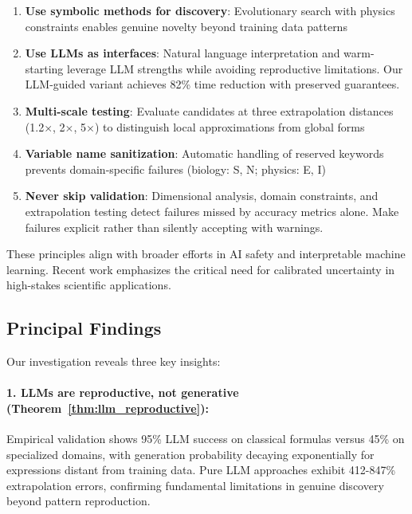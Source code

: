 \documentclass[twoside,11pt]{article}
\begin{document}
\begin{enumerate}
\item \textbf{Use symbolic methods for discovery}: Evolutionary search with physics constraints enables genuine novelty beyond training data patterns\citep{koza1994genetic}

\item \textbf{Use LLMs as interfaces}: Natural language interpretation and warm-starting leverage LLM strengths while avoiding reproductive limitations. Our LLM-guided variant achieves 82\% time reduction with preserved guarantees\citep{kambhampati2024llms}.

\item \textbf{Multi-scale testing}: Evaluate candidates at three extrapolation distances (1.2$\times$, 2$\times$, 5$\times$) to distinguish local approximations from global forms

\item \textbf{Variable name sanitization}: Automatic handling of reserved keywords prevents domain-specific failures (biology: S, N; physics: E, I)

\item \textbf{Never skip validation}: Dimensional analysis, domain constraints, and extrapolation testing detect failures missed by accuracy metrics alone. Make failures explicit rather than silently accepting with warnings.
\end{enumerate}

These principles align with broader efforts in AI safety and interpretable machine learning. Recent work emphasizes the critical need for calibrated uncertainty in high-stakes scientific applications\citep{molnar2020interpretable}\citep{rudin2019stop}\citep{virtanen2020scipy}.

\subsection{Principal Findings}

Our investigation reveals three key insights:

\paragraph{1\citep{kambhampati2024llms}. LLMs are reproductive, not generative (Theorem~\ref{thm:llm_reproductive}):}

Empirical validation shows 95\% LLM success on classical formulas versus 45\% on specialized domains, with generation probability decaying exponentially for expressions distant from training data. Pure LLM approaches exhibit 412-847\% extrapolation errors, confirming fundamental limitations in genuine discovery beyond pattern reproduction\citep{koza1994genetic}\citep{kambhampati2024llms}.
\end{document}
